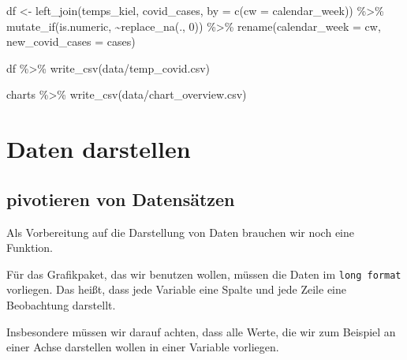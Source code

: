 \documentclass[
]{book}
\newenvironment{Shaded}{\begin{snugshade}}{\end{snugshade}}
\newcommand{\AttributeTok}[1]{\textcolor[rgb]{0.77,0.63,0.00}{#1}}
\newcommand{\DecValTok}[1]{\textcolor[rgb]{0.00,0.00,0.81}{#1}}
\newcommand{\FunctionTok}[1]{\textcolor[rgb]{0.00,0.00,0.00}{#1}}
\newcommand{\NormalTok}[1]{#1}
\newcommand{\OtherTok}[1]{\textcolor[rgb]{0.56,0.35,0.01}{#1}}
\newcommand{\SpecialCharTok}[1]{\textcolor[rgb]{0.00,0.00,0.00}{#1}}
\newcommand{\StringTok}[1]{\textcolor[rgb]{0.31,0.60,0.02}{#1}}
\begin{document}
\hypertarget{solution3}{}
\begin{Shaded}
\begin{Highlighting}[]
\NormalTok{df }\OtherTok{\textless{}{-}} \FunctionTok{left\_join}\NormalTok{(temps\_kiel, covid\_cases, }\AttributeTok{by =} \FunctionTok{c}\NormalTok{(}\StringTok{\textquotesingle{}cw\textquotesingle{}} \OtherTok{=} \StringTok{\textquotesingle{}calendar\_week\textquotesingle{}}\NormalTok{)) }\SpecialCharTok{\%\textgreater{}\%} 
  \FunctionTok{mutate\_if}\NormalTok{(is.numeric, }\SpecialCharTok{\textasciitilde{}}\FunctionTok{replace\_na}\NormalTok{(., }\DecValTok{0}\NormalTok{)) }\SpecialCharTok{\%\textgreater{}\%} 
  \FunctionTok{rename}\NormalTok{(}\StringTok{\textquotesingle{}calendar\_week\textquotesingle{}} \OtherTok{=} \StringTok{\textquotesingle{}cw\textquotesingle{}}\NormalTok{,}
         \StringTok{\textquotesingle{}new\_covid\_cases\textquotesingle{}} \OtherTok{=} \StringTok{\textquotesingle{}cases\textquotesingle{}}\NormalTok{)}

\NormalTok{df }\SpecialCharTok{\%\textgreater{}\%} \FunctionTok{write\_csv}\NormalTok{(}\StringTok{\textquotesingle{}data/temp\_covid.csv\textquotesingle{}}\NormalTok{)}

\NormalTok{charts }\SpecialCharTok{\%\textgreater{}\%} \FunctionTok{write\_csv}\NormalTok{(}\StringTok{\textquotesingle{}data/chart\_overview.csv\textquotesingle{}}\NormalTok{)}
\end{Highlighting}
\end{Shaded}

\hypertarget{daten-darstellen}{%
\chapter{Daten darstellen}\label{daten-darstellen}}

\hypertarget{pivotieren-von-datensuxe4tzen}{%
\section{pivotieren von Datensätzen}\label{pivotieren-von-datensuxe4tzen}}

Als Vorbereitung auf die Darstellung von Daten brauchen wir noch eine Funktion.

Für das Grafikpaket, das wir benutzen wollen, müssen die Daten im \texttt{long\ format} vorliegen. Das heißt, dass jede Variable eine Spalte und jede Zeile eine Beobachtung darstellt.

Insbesondere müssen wir darauf achten, dass alle Werte, die wir zum Beispiel an einer Achse darstellen wollen in einer Variable vorliegen.
\end{document}

